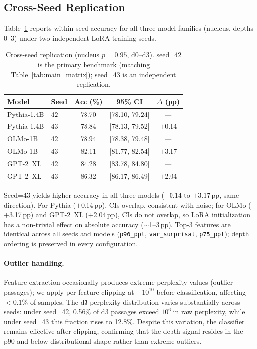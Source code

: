 \subsection{Cross-Seed Replication}
\label{app:seed_replication}

Table~\ref{tab:seed_replication} reports within-seed accuracy for all three model families (nucleus, depths 0--3) under two independent LoRA training seeds.

\begin{table}[h]
\centering
\small
\caption{Cross-seed replication (nucleus $p{=}0.95$, d0--d3). seed=42 is the primary benchmark (matching Table~\ref{tab:main_matrix}); seed=43 is an independent replication.}
\label{tab:seed_replication}
\begin{tabular}{@{}llccc@{}}
\toprule
Model & Seed & Acc (\%) & 95\% CI & $\Delta$ (pp) \\
\midrule
Pythia-1.4B & 42 & 78.70 & [78.10, 79.24] & --- \\
Pythia-1.4B & 43 & 78.84 & [78.13, 79.52] & $+$0.14 \\
\midrule
OLMo-1B & 42 & 78.94 & [78.38, 79.48] & --- \\
OLMo-1B & 43 & 82.11 & [81.77, 82.54] & $+$3.17 \\
\midrule
GPT-2~XL & 42 & 84.28 & [83.78, 84.80] & --- \\
GPT-2~XL & 43 & 86.32 & [86.17, 86.49] & $+$2.04 \\
\bottomrule
\end{tabular}
\end{table}

Seed=43 yields higher accuracy in all three models ($+$0.14 to $+$3.17\,pp, same direction).
For Pythia ($+$0.14\,pp), CIs overlap, consistent with noise; for OLMo ($+$3.17\,pp) and GPT-2~XL ($+$2.04\,pp), CIs do not overlap, so LoRA initialization has a non-trivial effect on absolute accuracy (${\sim}$1--3\,pp).
Top-3 features are identical across all seeds and models (\texttt{p90\_ppl}, \texttt{var\_surprisal}, \texttt{p75\_ppl}); depth ordering is preserved in every configuration.

\paragraph{Outlier handling.}
Feature extraction occasionally produces extreme perplexity values (outlier passages); we apply per-feature clipping at $\pm 10^{10}$ before classification, affecting ${<}0.1$\% of samples.
The d3 perplexity distribution varies substantially across seeds: under seed=42, 0.56\% of d3 passages exceed $10^6$ in raw perplexity, while under seed=43 this fraction rises to 12.8\%.
Despite this variation, the classifier remains effective after clipping, confirming that the depth signal resides in the p90-and-below distributional shape rather than extreme outliers.

